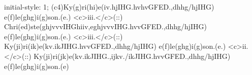 initial-style: 1;
(c4)Ky(g)ri(hi)e(iv.hjIHG.hvhvGFED.,dhhg/hjIHG) e(f)le(ghg)i(g)son.(e.) <c>iii.</c>(::)
Chri(ed)ste(ghjvvvIHGhiiv,eghjvvvIHG.hvvGFED.,dhhg/hjIHG) e(f)le(ghg)i(g)son.(e.) <c>iii.</c>(::)
Ky(ji)ri(ik)e(kv.ikJIHG.hvvGFED.,dhhg/hjIHG) e(f)le(ghg)i(g)son.(e.) <c>ii.</c>(::)
Ky(ji)ri(jk)e(kv.ikJIHG.,ijkv./ikJIHG.hvvGFED.,dhhg/hjIHG) e(f)le(ghg)i(g)son.(e)
